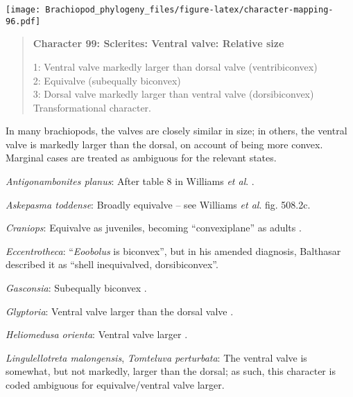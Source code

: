 \documentclass[openany]{book}
\theoremstyle{definition}
\theoremstyle{definition}
\theoremstyle{definition}
\theoremstyle{remark}
\begin{document}
\texttt{[image: Brachiopod\_phylogeny\_files/figure-latex/character-mapping-96.pdf]}

\begin{quote}
\textbf{Character 99: Sclerites: Ventral valve: Relative size}

1: Ventral valve markedly larger than dorsal valve (ventribiconvex)\\
2: Equivalve (subequally biconvex)\\
3: Dorsal valve markedly larger than ventral valve (dorsibiconvex)\\
Transformational character.
\end{quote}

In many brachiopods, the valves are closely similar in size; in others,
the ventral valve is markedly larger than the dorsal, on account of
being more convex. Marginal cases are treated as ambiguous for the
relevant states.

\hypertarget{Antigonambonites_planus-coding-99}{}
\emph{Antigonambonites planus}: After table 8 in Williams \emph{et al}.
\citeyearpar{Williams2000LinguliformeaCraniiformea}.

\hypertarget{Askepasma_toddense-coding-99}{}
\emph{Askepasma toddense}: Broadly equivalve -- see Williams \emph{et
al}. \citeyearpar{Williams2000LinguliformeaCraniiformea} fig. 508.2c.

\hypertarget{Craniops-coding-99}{}
\emph{Craniops}: Equivalve as juveniles, becoming ``convexiplane''
\citep[p.~187]{Williams2000LinguliformeaCraniiformea} as adults
\citep{Hanken1985Thetaxonomy}.

\hypertarget{Eccentrotheca-coding-99}{}
\emph{Eccentrotheca}: ``\emph{Eoobolus} is biconvex'', but in his
amended diagnosis, Balthasar \citeyearpar{Balthasar2009Thebrachiopod}
described it as ``shell inequivalved, dorsibiconvex''.

\hypertarget{Gasconsia-coding-99}{}
\emph{Gasconsia}: Subequally biconvex
\citep[p.~192]{Williams2000LinguliformeaCraniiformea}.

\hypertarget{Glyptoria-coding-99}{}
\emph{Glyptoria}: Ventral valve larger than the dorsal valve
\citep[p.~659]{Zhang2009Architectureand}.

\hypertarget{Heliomedusa_orienta-coding-99}{}
\emph{Heliomedusa orienta}: Ventral valve larger \citep[see][fig.
125.]{Williams2000LinguliformeaCraniiformea}.

\hypertarget{Lingulellotreta_malongensis-coding-99}{}
\emph{Lingulellotreta malongensis}, \emph{Tomteluva perturbata}: The
ventral valve is somewhat, but not markedly, larger than the dorsal; as
such, this character is coded ambiguous for equivalve/ventral valve
larger.
\end{document}
